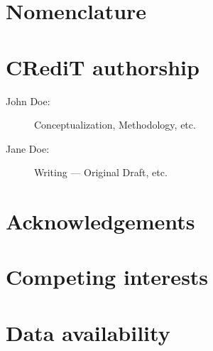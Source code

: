
\section{Nomenclature}
\label{app:nomenclature}


\section{CRediT authorship}
\label{app:credit}

\begin{description}
    \item[John Doe:] Conceptualization, Methodology, etc.
    \item[Jane Doe:] Writing --- Original Draft, etc.
\end{description}


\section{Acknowledgements}
\label{app:acknowledgements}


\section{Competing interests}
\label{app:interests}


\section{Data availability}
\label{app:data}

